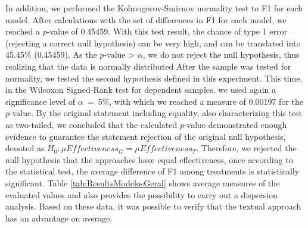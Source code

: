 In addition, we performed the Kolmogorov-Smirnov normality test to F1 for each model. 
After calculations with the set of differences in F1 for each model, we reached a $p$-value of 0.45459.
With this test result, the chance of type 1 error (rejecting a correct null hypothesis) can be very high, and can be translated into 45.45\% (0.45459).
As the $p$-value > $\alpha$, we do not reject the null hypothesis, thus realizing that the data is normally distributed
After the sample was tested for normality, we tested the second hypothesis defined in this experiment.
This time, in the Wilcoxon Signed-Rank test for dependent samples, we used again a significance level of $\alpha$~=~5\%, with which we reached a measure of 0.00197 for the $p$-value.
By the original statement including equality, also characterizing this test as two-tailed, we concluded that the calculated $p$-value demonstrated enough evidence to guarantee the statement rejection of the original null hypothesis, denoted as $H_0: \mu Effectiveness_G = \mu Effectiveness_T$.
Therefore, we rejected the null hypothesis that the approaches have equal effectiveness, once according to the statistical test, the average difference of F1 among treatments is statistically significant.
Table \ref{tab:ResultsModelosGeral} shows average measures of the evaluated values and also provides the possibility to carry out a dispersion analysis.
Based on these data, it was possible to verify that the textual approach has an advantage on average.

